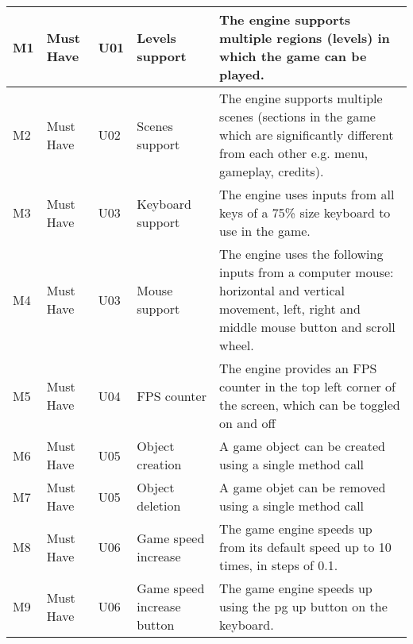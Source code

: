 \documentclass{article} %
\begin{document}
\begin{longtable}{|p{}|p{}|p{}|p{}|p{}|}
    M1                          & Must Have                          & U01                & Levels support              & The engine supports multiple regions (levels) in which the game can be played.                                                                         \\ \hline
    M2                          & Must Have                          & U02                & Scenes support              & The engine supports multiple scenes (sections in the game which are significantly different from each other e.g. menu, gameplay, credits).             \\ \hline
    M3                          & Must Have                          & U03                & Keyboard support            & The engine uses inputs from all keys of a 75\% size keyboard to use in the game. \\ \hline
    M4                          & Must Have                          & U03                & Mouse support               & The engine uses the following inputs from a computer mouse: horizontal and vertical movement, left, right and middle mouse button and scroll wheel.      \\ \hline
    M5                          & Must Have                          & U04                & FPS counter                 & The engine provides an FPS counter in the top left corner of the screen, which can be toggled on and off                                               \\ \hline
    M6                          & Must Have                          & U05                & Object creation             & A game object can be created using a single method call                                                                                                     \\ \hline
    M7                          & Must Have                          & U05                & Object deletion             & A game objet can be removed using a single method call                                                                                                      \\ \hline
    M8                          & Must Have                          & U06                & Game speed increase         & The game engine speeds up from its default speed up to 10 times, in steps of 0.1.                                                                      \\ \hline
    M9                          & Must Have                          & U06                & Game speed increase button  & The game engine speeds up using the pg up button on the keyboard.                                                                                      \\ \hline

\end{longtable}
\end{document}
